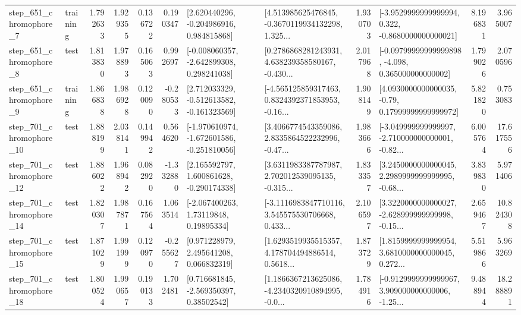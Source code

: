 \begin{tabular}{llrrrrllrlrr}
   step\_651\_chromophore\_7 &  training &      1.792633 &    1.929355 &      0.136722 &  0.190347 &    [2.620440296, -0.204986916, 0.984815868] &  [4.513985625476845, -0.3670119934132298, 1.325... &       1.930703 &  [-3.9529999999999994, 0.322, -0.8680000000000021] &            8.196831 &          3.965007 \\
   step\_651\_chromophore\_8 &      test &      1.813830 &    1.978893 &      0.165063 &  0.992697 &   [-0.008060357, -2.642899308, 0.298241038] &  [0.2786868281243931, 4.638239358580167, -0.430... &       2.017968 &  [-0.09799999999999898, -4.098, 0.365000000000002] &            1.799026 &          2.070596 \\
   step\_651\_chromophore\_9 &  training &      1.866838 &    1.986928 &      0.120090 & -0.280533 &   [2.712033329, -0.512613582, -0.161323569] &  [-4.565125859317463, 0.8324392371853953, -0.16... &       1.908149 &   [4.0930000000000035, -0.79, 0.17999999999999972] &            5.821820 &          0.753083 \\
  step\_701\_chromophore\_10 &      test &      1.888199 &    2.038141 &      0.149942 &  0.564620 &  [-1.970610974, -1.672601586, -0.251810056] &  [3.4066774543359086, 2.8335864522232996, -0.47... &       1.983666 &  [-3.049999999999997, -2.710000000000001, -0.82... &            6.005764 &         17.617556 \\
  step\_701\_chromophore\_12 &      test &      1.886022 &    1.968942 &      0.082920 & -1.332880 &    [2.165592797, 1.600861628, -0.290174338] &  [3.6311983387787987, 2.702012539095135, -0.315... &       1.833357 &  [3.2450000000000045, 2.2989999999999995, -0.68... &            3.839830 &          5.971406 \\
  step\_701\_chromophore\_14 &      test &      1.820307 &    1.987871 &      0.167564 &  1.063514 &      [-2.067400263, 1.73119848, 0.19895334] &  [-3.1116983847710116, 3.545575530706668, 0.433... &       2.106597 &  [3.3220000000000027, -2.628999999999998, -0.15... &            2.659467 &         10.824308 \\
  step\_701\_chromophore\_15 &      test &      1.871029 &    1.991999 &      0.120970 & -0.255627 &     [0.971228979, 2.495641208, 0.066832319] &  [1.6293519935515357, 4.178704494886514, 0.5618... &       1.873729 &  [1.8159999999999954, 3.6810000000000045, 0.272... &            5.519866 &          5.963269 \\
  step\_701\_chromophore\_18 &      test &      1.800524 &    1.990657 &      0.190133 &  1.702481 &     [0.716681845, -2.569350397, 0.38502542] &  [1.1866367213625086, -4.2340320910894995, -0.0... &       1.784916 &  [-0.9129999999999967, 3.909000000000006, -1.25... &            9.488944 &         18.288891 \\

\end{tabular}
